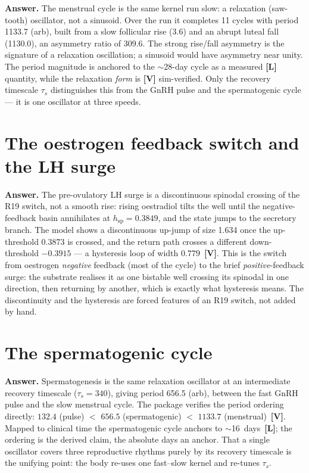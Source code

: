 \documentclass[11pt]{article}
\newcommand{\gradeV}{\textcolor{verified}{\textbf{[V]}}}
\newcommand{\gradeL}{\textcolor{verified}{\textbf{[L]}}}
\begin{document}
\textbf{Answer.} The menstrual cycle is the same kernel run slow: a relaxation (saw-tooth) oscillator, not a
sinusoid. Over the run it completes 11 cycles with period 1133.7
(arb), built from a slow follicular rise (3.6) and an abrupt luteal fall
(1130.0), an asymmetry ratio of 309.6. The strong
rise/fall asymmetry is the signature of a relaxation oscillation; a sinusoid would have asymmetry near unity.
The period magnitude is anchored to the $\sim$28-day cycle as a measured \gradeL{} quantity, while the
relaxation \emph{form} is \gradeV{} sim-verified. Only the recovery timescale $\tau_s$ distinguishes this from
the GnRH pulse and the spermatogenic cycle --- it is one oscillator at three speeds.

\section{The oestrogen feedback switch and the LH surge}

\textbf{Answer.} The pre-ovulatory LH surge is a discontinuous spinodal crossing of the R19 switch, not a
smooth rise: rising oestradiol tilts the well until the negative-feedback basin annihilates at
$h_{\mathrm{sp}}=0.3849$, and the state jumps to the secretory branch. The model shows
a discontinuous up-jump of size 1.634 once the up-threshold
$0.3873$ is crossed, and the return path crosses a different down-threshold
$-0.3915$ --- a hysteresis loop of width
$0.779$~\gradeV{}. This is the switch from oestrogen \emph{negative}
feedback (most of the cycle) to the brief \emph{positive}-feedback surge: the substrate realises it as one
bistable well crossing its spinodal in one direction, then returning by another, which is exactly what
hysteresis means. The discontinuity and the hysteresis are forced features of an R19 switch, not added by
hand.

\section{The spermatogenic cycle}

\textbf{Answer.} Spermatogenesis is the same relaxation oscillator at an intermediate recovery timescale
($\tau_s=340$), giving period 656.5 (arb), between the
fast GnRH pulse and the slow menstrual cycle. The package verifies the period ordering directly:
$132.4$ (pulse) $<$ $656.5$ (spermatogenic)
$<$ $1133.7$ (menstrual)~\gradeV{}. Mapped to clinical time the spermatogenic
cycle anchors to $\sim$16~days~\gradeL{}; the ordering is the derived claim, the absolute days an anchor. That
a single oscillator covers three reproductive rhythms purely by its recovery timescale is the unifying point:
the body re-uses one fast--slow kernel and re-tunes $\tau_s$.
\end{document}
